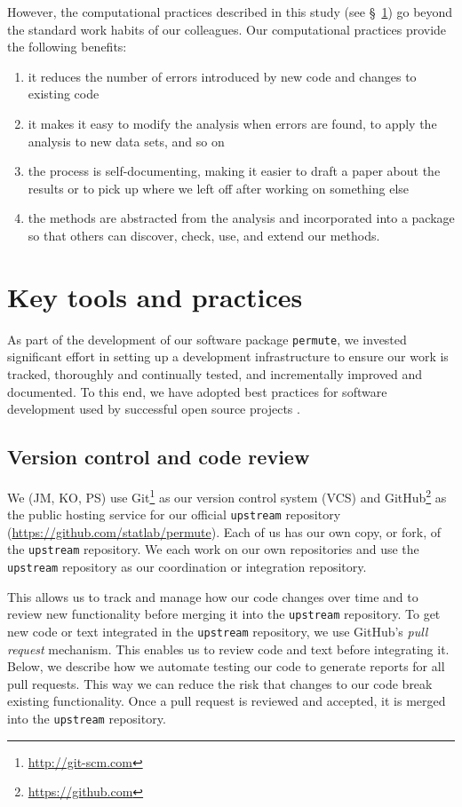 \documentclass[]{article}
\begin{document}
However, the computational practices described in this study
(see \S~\ref{key-tools}) go beyond the standard work habits of our colleagues.
Our computational practices provide the following benefits:
\begin{enumerate}
 \item it reduces the number of errors introduced by new code and changes to
    existing code
  \item it makes it easy to modify the analysis when errors are found, to apply the
    analysis to new data sets, and so on
  \item the process is self-documenting, making it easier to draft a paper about
    the results or to pick up where we left off after working on something else
   \item the methods are abstracted from the analysis and incorporated into a
    package so that others can discover, check, use, and extend our methods.
\end{enumerate}

\section{Key tools and practices}\label{key-tools}

As part of the development of our software package \texttt{permute}, we
invested significant effort in setting up a development infrastructure to
ensure our work is tracked, thoroughly and continually tested, and
incrementally improved and documented.
To this end, we have adopted best practices for software development used by
successful open source projects \citep{millman2014developing}.

\subsection{Version control and code review}

We (JM, KO, PS) use Git\footnote{
\url{http://git-scm.com}
}
as our version control system (VCS) and GitHub\footnote{
\url{https://github.com}
} as the public hosting service for our official \texttt{upstream} repository
(\url{https://github.com/statlab/permute}).
Each of us has our own copy, or fork, of the \texttt{upstream} repository.
We each work on our own repositories and use the \texttt{upstream} repository
as our coordination or integration repository.

This allows us to track and manage how our code changes over time and to
review new functionality before merging it into the \texttt{upstream}
repository.
To get new code or text integrated in the \texttt{upstream} repository, we use
GitHub's \emph{pull request} mechanism.
This enables us to review code and text before integrating it.
Below, we describe how we automate testing our code to generate reports for all
pull requests.
This way we can reduce the risk that changes to our code break existing
functionality.
Once a pull request is reviewed and accepted, it is merged into the
\texttt{upstream} repository.
\end{document}
